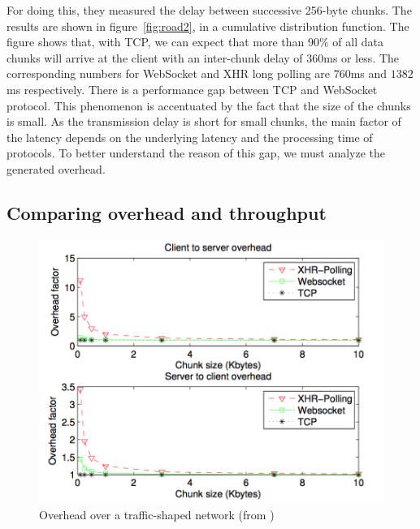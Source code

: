\documentclass[10pt,journal,compsoc]{IEEEtran}
\newcommand{\ws}{WebSocket}
\begin{document}
For doing this, they measured the delay between successive 256-byte chunks. 
The results are shown in figure~\ref{fig:road2}, in a cumulative distribution function.
The figure shows that, with TCP, we can expect that more than 90\% of all data chunks will arrive at the client with an inter-chunk delay of 360ms or less. The corresponding numbers for \ws{} and XHR long polling are $760$ms and $1382$ms respectively.
There is a performance gap between TCP and \ws{} protocol.
This phenomenon is accentuated by the fact that the size of the chunks is small.
As the transmission delay is short for small chunks, the main factor of the latency depends on the underlying latency and the processing time of protocols.
To better understand the reason of this gap, we must analyze the generated overhead.

\subsection{Comparing overhead and throughput}

\begin{figure}[!ht]
    \centering
    \includegraphics[width=\linewidth]{road4.png}
    \caption{Overhead over a traffic-shaped network (from \cite{roadblock})}
    \label{fig:road4}
\end{figure}
\end{document}
